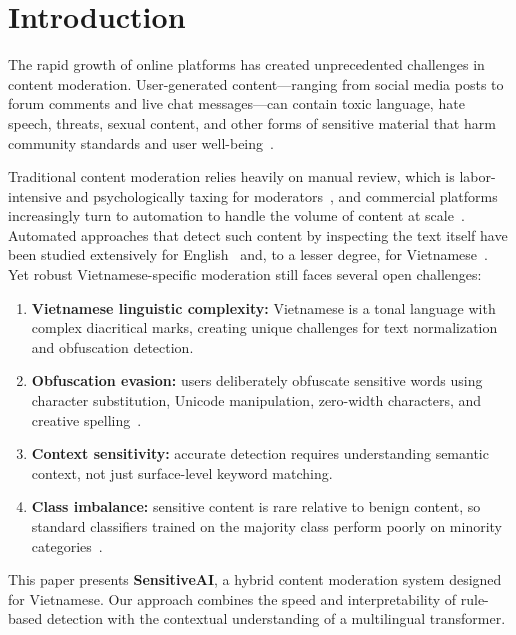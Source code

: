 \documentclass[runningheads]{llncs}
\begin{document}
\section{Introduction}

The rapid growth of online platforms has created unprecedented challenges in content moderation.
User-generated content---ranging from social media posts to forum comments and live chat messages---can contain toxic language, hate speech, threats, sexual content, and other forms of sensitive material that harm community standards and user well-being~\cite{zampieri2019}.

Traditional content moderation relies heavily on manual review, which is labor-intensive and psychologically taxing for moderators~\cite{roberts2019}, and commercial platforms increasingly turn to automation to handle the volume of content at scale~\cite{gorwa2020}.
Automated approaches that detect such content by inspecting the text itself have been studied extensively for English~\cite{warner2012,schmidt2017,wulczyn2017,devlin2019} and, to a lesser degree, for Vietnamese~\cite{luu2021,nguyen2020phobert}.
Yet robust Vietnamese-specific moderation still faces several open challenges:

\begin{enumerate}[leftmargin=*,label=(\roman*)]
\item \textbf{Vietnamese linguistic complexity:} Vietnamese is a tonal language with complex diacritical marks, creating unique challenges for text normalization and obfuscation detection.
\item \textbf{Obfuscation evasion:} users deliberately obfuscate sensitive words using character substitution, Unicode manipulation, zero-width characters, and creative spelling~\cite{cooper2023,boucher2022,mishra2018}.
\item \textbf{Context sensitivity:} accurate detection requires understanding semantic context, not just surface-level keyword matching.
\item \textbf{Class imbalance:} sensitive content is rare relative to benign content, so standard classifiers trained on the majority class perform poorly on minority categories~\cite{hegarcia2009}.
\end{enumerate}

This paper presents \textbf{SensitiveAI}, a hybrid content moderation system designed for Vietnamese.
Our approach combines the speed and interpretability of rule-based detection with the contextual understanding of a multilingual transformer.
\end{document}
